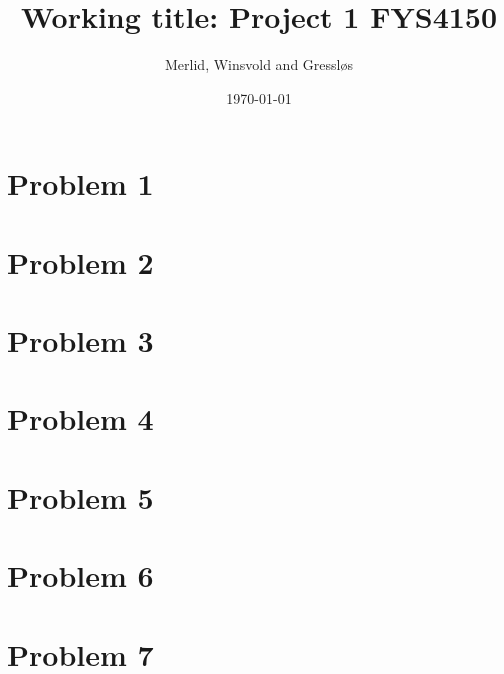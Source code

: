 \documentclass[aps,rmp,preprint,amsmath,amssymb,longbibliography,floatfix]{revtex4-1}
\begin{document}
\title{Working title: Project 1 FYS4150}

\author{Merlid, Winsvold and Gressløs}
\date{\today}


\begin{abstract}

\end{abstract}

\maketitle

\tableofcontents

\section*{Problem 1}
\label{sec:prob1}


\section*{Problem 2}
\label{sec:prob2}


\section*{Problem 3}
\label{sec:prob3}


\section*{Problem 4}
\label{sec:prob4}

\section*{Problem 5}
\label{sec:prob5}

\section*{Problem 6}
\label{sec:prob6}

\section*{Problem 7}
\label{sec:prob7}
\end{document}
